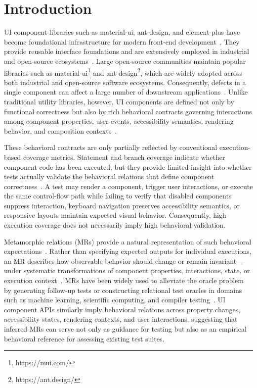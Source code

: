 \section{Introduction}\label{sec:introduciton}

UI component libraries such as material-ui, ant-design, and element-plus have become foundational infrastructure for modern front-end development~\cite{delgado2016reusing, abdalkareem2017developers, lazuardy2022modern}. They provide reusable interface foundations and are extensively employed in industrial and open-source ecosystems~\cite{decan2019empirical, naik2023awesome, weeraddana2024dependency}. Large open-source communities maintain popular libraries such as material-ui\footnote{https://mui.com/} and ant-design\footnote{https://ant.design/}, which are widely adopted across both industrial and open-source software ecosystems. Consequently, defects in a single component can affect a large number of downstream applications~\cite{venturini2023depended}. Unlike traditional utility libraries, however, UI components are defined not only by functional correctness but also by rich behavioral contracts governing interactions among component properties, user events, accessibility semantics, rendering behavior, and composition contexts~\cite{barr2014oracle,alshayban2020accessibility, zhou2025declarui, bajammal2021semantic}.

These behavioral contracts are only partially reflected by conventional execution-based coverage metrics. Statement and branch coverage indicate whether component code has been executed, but they provide limited insight into whether tests actually validate the behavioral relations that define component correctness~\cite{inozemtseva2014coverage,gopinath2014code,kochhar2017code,andrews2005mutation, schuler2011assessing}. A test may render a component, trigger user interactions, or execute the same control-flow path while failing to verify that disabled components suppress interaction, keyboard navigation preserves accessibility semantics, or responsive layouts maintain expected visual behavior. Consequently, high execution coverage does not necessarily imply high behavioral validation.

Metamorphic relations (MRs) provide a natural representation of such behavioral expectations~\cite{zhou2018metamorphic, zhang2023automated, li2025metamorphic}. Rather than specifying expected outputs for individual executions, an MR describes how observable behavior should change or remain invariant—under systematic transformations of component properties, interactions, state, or execution context~\cite{chen2018metamorphic,cho2025metamorphic,tsigkanos2023large}. MRs have been widely used to alleviate the oracle problem by generating follow-up tests or constructing relational test oracles in domains such as machine learning, scientific computing, and compiler testing~\cite{tian2018deeptest,zhang2018deeproad,chen2016empirical, NolascoMDGGPUAF24}. UI component APIs similarly imply behavioral relations across property changes, accessibility states, rendering contexts, and user interactions, suggesting that inferred MRs can serve not only as guidance for testing but also as an empirical behavioral reference for assessing existing test suites.

